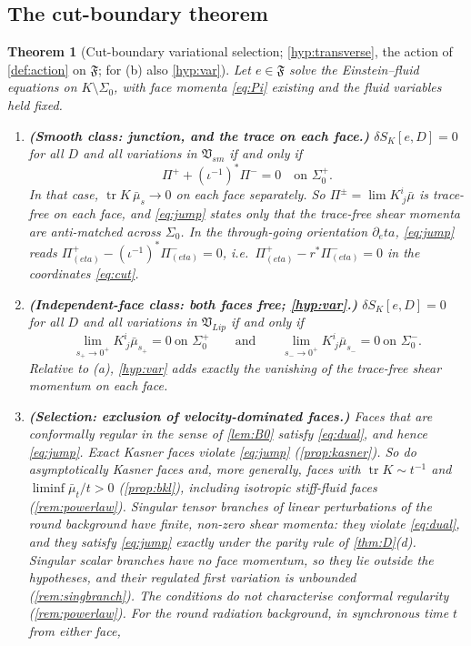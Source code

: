 \documentclass[11pt]{article}
\theoremstyle{canonmath}
\theoremstyle{canonpostulate}
\theoremstyle{canonproposition}
\theoremstyle{canonmath}
\newtheorem{mainthm}{Theorem}
\theoremstyle{canonproposition}
\providecommand{\Vlip}{\mathfrak{V}_{\mathrm{Lip}}}
\providecommand{\Vsm}{\mathfrak{V}_{\mathrm{sm}}}
\providecommand{\Fcl}{\mathfrak{F}}
\providecommand{\Klein}{\mathcal{K}}
\def\mathrm#1{#1}%
\def\mathcal#1{#1}%
\def\eta{eta}%
\begin{document}
\subsection{The cut-boundary theorem}

\begin{mainthm}[Cut-boundary variational selection; \ref{hyp:transverse}, the action of \cref{def:action} on $\Fcl$; for (b) also \ref{hyp:var}]\label{thm:B}
Let $e\in\Fcl$ solve the Einstein--fluid equations on $\Klein\setminus\Sigma_0$, with face momenta \eqref{eq:Pi} existing and the fluid variables held fixed.
\begin{enumerate}[label=(\alph*)]
\item \textbf{(Smooth class: junction, and the trace on each face.)} $\delta\mathcal{S}_{\Klein}[e,\mathcal{D}] = 0$ for all $\mathcal{D}$ and all variations in $\Vsm$ if and only if
\begin{equation}
\Pi^+ + (\iota^{-1})^*\Pi^- = 0 \quad\text{on }\Sigma_0^+.
\label{eq:jump}
\end{equation}
In that case, $\operatorname{tr}K\,\bar\mu_{s}\to0$ on each face separately. So $\Pi^\pm = \lim K^i_{\ j}\bar\mu$ is trace-free on each face, and \eqref{eq:jump} states only that the trace-free shear momenta are anti-matched across $\Sigma_0$. In the through-going orientation $\partial_\eta$, \eqref{eq:jump} reads $\Pi^+_{(\eta)} - (\iota^{-1})^*\Pi^-_{(\eta)} = 0$, i.e.\ $\Pi^+_{(\eta)} - r^*\Pi^-_{(\eta)} = 0$ in the coordinates \eqref{eq:cut}.
\item \textbf{(Independent-face class: both faces free; \ref{hyp:var}.)} $\delta\mathcal{S}_{\Klein}[e,\mathcal{D}] = 0$ for all $\mathcal{D}$ and all variations in $\Vlip$ if and only if
\begin{equation}
\lim_{s_+\to0^+}K^i_{\ j}\bar\mu_{s_+} = 0\ \text{on }\Sigma_0^+ \qquad\text{and}\qquad \lim_{s_-\to0^+}K^i_{\ j}\bar\mu_{s_-} = 0\ \text{on }\Sigma_0^-.
\label{eq:dual}
\end{equation}
Relative to (a), \ref{hyp:var} adds exactly the vanishing of the trace-free shear momentum on each face.
\item \textbf{(Selection: exclusion of velocity-dominated faces.)} Faces that are conformally regular in the sense of \cref{lem:B0} satisfy \eqref{eq:dual}, and hence \eqref{eq:jump}. Exact Kasner faces violate \eqref{eq:jump} (\cref{prop:kasner}). So do asymptotically Kasner faces and, more generally, faces with $\operatorname{tr}K\sim t^{-1}$ and $\liminf\bar\mu_t/t>0$ (\cref{prop:bkl}), including isotropic stiff-fluid faces (\cref{rem:powerlaw}). Singular tensor branches of linear perturbations of the round background have finite, non-zero shear momenta: they violate \eqref{eq:dual}, and they satisfy \eqref{eq:jump} exactly under the parity rule of \cref{thm:D}(d). Singular scalar branches have no face momentum, so they lie outside the hypotheses, and their regulated first variation is unbounded (\cref{rem:singbranch}). The conditions do not characterise conformal regularity (\cref{rem:powerlaw}). For the round radiation background, in synchronous time $t$ from either face,

\end{enumerate}
\end{mainthm}
\end{document}
